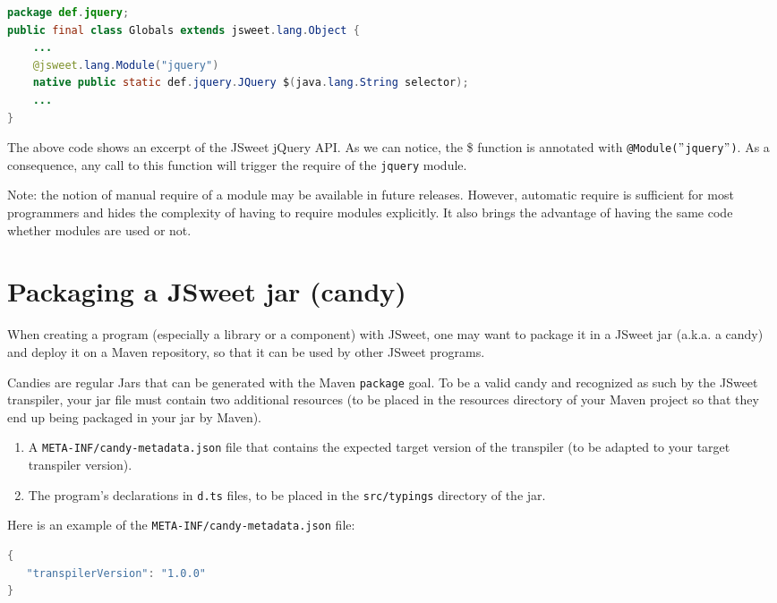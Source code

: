 \documentclass[a4paper]{report}
\begin{document}
\begin{lstlisting}[language=Java]
package def.jquery;
public final class Globals extends jsweet.lang.Object {
	...
	@jsweet.lang.Module("jquery")
	native public static def.jquery.JQuery $(java.lang.String selector);
	...
}
\end{lstlisting}

The above code shows an excerpt of the JSweet jQuery API. As we can notice, the \$ function is annotated with \texttt{@Module($"$jquery$"$)}. As a consequence, any call to this function will trigger the require of the \texttt{jquery} module.

Note: the notion of manual require of a module may be available in future releases. However, automatic require is sufficient for most programmers and hides the complexity of having to require modules explicitly. It also brings the advantage of having the same code whether modules are used or not.

\section{Packaging a JSweet jar (candy)}

When creating a program (especially a library or a component) with JSweet, one may want to package it in a JSweet jar (a.k.a. a candy) and deploy it on a Maven repository, so that it can be used by other JSweet programs.

Candies are regular Jars that can be generated with the Maven \texttt{package} goal. To be a valid candy and recognized as such by the JSweet transpiler, your jar file must contain two additional resources (to be placed in the resources directory of your Maven project so that they end up being packaged in your jar by Maven).

\begin{enumerate}
\item A \texttt{META-INF/candy-metadata.json} file that contains the expected target version of the transpiler (to be adapted to your target transpiler version).
\item The program's declarations in \texttt{d.ts} files, to be placed in the \texttt{src/typings} directory of the jar.
\end{enumerate}

Here is an example of the \texttt{META-INF/candy-metadata.json} file:

\begin{lstlisting}[language=Java]
{
   "transpilerVersion": "1.0.0"
}
\end{lstlisting}
\end{document}
